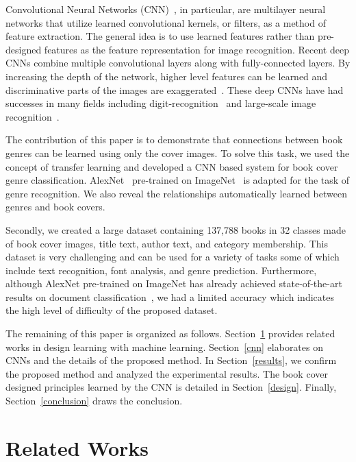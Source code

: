 \documentclass[conference]{IEEEtran}
\begin{document}
Convolutional Neural Networks (CNN)~\cite{lecun1998gradient}, in particular, are multilayer neural networks that utilize learned convolutional kernels, or filters, as a method of feature extraction.
The general idea is to use learned features rather than pre-designed features as the feature representation for image recognition.
Recent deep CNNs combine multiple convolutional layers along with fully-connected layers.
By increasing the depth of the network, higher level features can be learned and discriminative parts of the images are exaggerated~\cite{zeiler2014visualizing}.
These deep CNNs have had successes in many fields including digit-recognition~\cite{lecun1998gradient,ciresan2012multi} and large-scale image recognition~\cite{szegedy2015going,simonyan2014very}.

The contribution of this paper is to demonstrate that connections between book genres can be learned using only the cover images.
To solve this task, we used the concept of transfer learning and developed a CNN based system for book cover genre classification.
AlexNet~\cite{krizhevsky2012imagenet} pre-trained on ImageNet~\cite{imagenet_cvpr09} is adapted for the task of genre recognition.
We also reveal the relationships automatically learned between genres and book covers.

Secondly, we created a large dataset containing 137,788 books in 32 classes made of book cover images, title text, author text, and category membership. 
This dataset is very challenging and can be used for a variety of tasks some of which include text recognition, font analysis, and genre prediction.
Furthermore, although AlexNet pre-trained on ImageNet has already achieved state-of-the-art results on document classification~\cite{afzal2015deepdocclassifier,kang2014convolutional}, we had a limited accuracy which indicates the high level of difficulty of the proposed dataset.

The remaining of this paper is organized as follows. 
Section~\ref{related} provides related works in design learning with machine learning.
Section~\ref{cnn} elaborates on CNNs and the details of the proposed method.
In Section~\ref{results}, we confirm the proposed method and analyzed the experimental results.
The book cover designed principles learned by the CNN is detailed in Section~\ref{design}.
Finally, Section~\ref{conclusion} draws the conclusion.

\section{Related Works}
\label{related}
\end{document}

